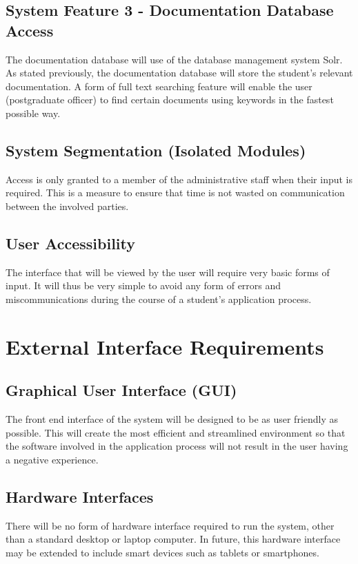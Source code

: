 \documentclass[journal,comsoc,onecolumn]{IEEEtran}
\begin{document}
\subsection{System Feature 3 - Documentation Database Access}

The documentation database will use of the database management system Solr. As stated previously, the documentation database will store the student's relevant documentation. A form of full text searching feature will enable the user (postgraduate officer) to find certain documents using keywords in the fastest possible way.

\subsection{System Segmentation (Isolated Modules)}
Access is only granted to a member of the administrative staff when their input is required. This is a measure to ensure that time is not wasted on communication between the involved parties.

\subsection{User Accessibility}
The interface that will be viewed by the user will require very basic forms of input. It will thus be very simple to avoid any form of errors and miscommunications during the course of a student's application process.

\pagebreak


\section{External Interface Requirements}

\subsection{Graphical User Interface (GUI)}
The front end interface of the system will be designed to be as user friendly as possible. This will create the most efficient and streamlined environment so that the software involved in the application process will not result in the user having a negative experience.

\subsection{Hardware Interfaces}
There will be no form of hardware interface required to run the system, other than a standard desktop or laptop computer. In future, this hardware interface may be extended to include smart devices such as tablets or smartphones.
\end{document}
